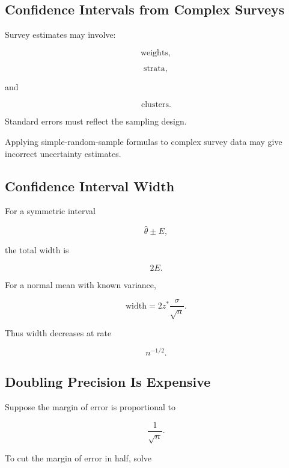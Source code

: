 \subsection{Confidence Intervals from Complex Surveys}
\label{subsec:complex-survey-confidence-intervals}

Survey estimates may involve:

\[
\boxed{
\text{weights},
}
\]

\[
\boxed{
\text{strata},
}
\]

and

\[
\boxed{
\text{clusters}.
}
\]

Standard errors must reflect the sampling design.

Applying simple-random-sample formulas to complex survey data may give
incorrect uncertainty estimates.

\subsection{Confidence Interval Width}
\label{subsec:confidence-interval-width}

For a symmetric interval

\[
\widehat{\theta}
\pm E,
\]

the total width is

\[
\boxed{
2E.
}
\]

For a normal mean with known variance,

\[
\boxed{
\text{width}
=
2z^*
\frac{\sigma}{\sqrt{n}}.
}
\]

Thus width decreases at rate

\[
\boxed{
n^{-1/2}.
}
\]

\subsection{Doubling Precision Is Expensive}
\label{subsec:precision-sample-size}

Suppose the margin of error is proportional to

\[
\frac1{\sqrt{n}}.
\]

To cut the margin of error in half, solve

